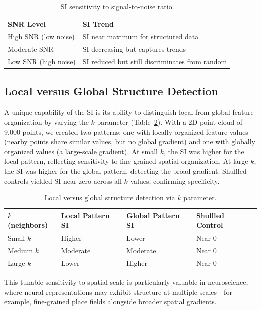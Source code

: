 \documentclass[12pt]{article}
\begin{document}
\begin{table}[htbp]
\centering
\caption{SI sensitivity to signal-to-noise ratio.}
\label{tab:snr}
\begin{tabular}{ll}
\toprule
SNR Level & SI Trend \\
\midrule
High SNR (low noise) & SI near maximum for structured data \\
Moderate SNR & SI decreasing but captures trends \\
Low SNR (high noise) & SI reduced but still discriminates from random \\
\bottomrule
\end{tabular}
\end{table}

\subsection{Local versus Global Structure Detection}

A unique capability of the SI is its ability to distinguish local from global feature organization by varying the $k$ parameter (Table~\ref{tab:local_global}). With a 2D point cloud of 9,000 points, we created two patterns: one with locally organized feature values (nearby points share similar values, but no global gradient) and one with globally organized values (a large-scale gradient). At small $k$, the SI was higher for the local pattern, reflecting sensitivity to fine-grained spatial organization. At large $k$, the SI was higher for the global pattern, detecting the broad gradient. Shuffled controls yielded SI near zero across all $k$ values, confirming specificity.

\begin{table}[htbp]
\centering
\caption{Local versus global structure detection via $k$ parameter.}
\label{tab:local_global}
\begin{tabular}{llll}
\toprule
$k$ (neighbors) & Local Pattern SI & Global Pattern SI & Shuffled Control \\
\midrule
Small $k$ & Higher & Lower & Near 0 \\
Medium $k$ & Moderate & Moderate & Near 0 \\
Large $k$ & Lower & Higher & Near 0 \\
\bottomrule
\end{tabular}
\end{table}

This tunable sensitivity to spatial scale is particularly valuable in neuroscience, where neural representations may exhibit structure at multiple scales---for example, fine-grained place fields alongside broader spatial gradients.
\end{document}

